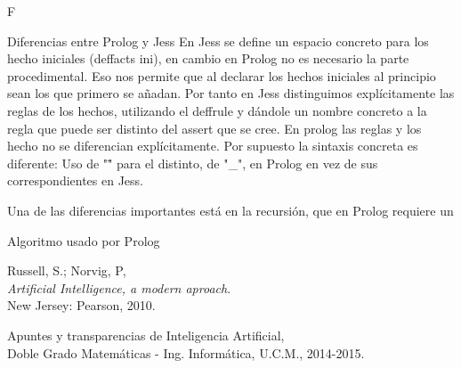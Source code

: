 F\documentclass[11pt, a4paper, spanish, openright, twoside]{book}
\begin{document}
\begin{section}{Diferencias entre Prolog y Jess}
		En Jess se define un espacio concreto para los hecho iniciales (deffacts ini), en cambio en Prolog no es necesario la parte procedimental. Eso nos permite que 
		al declarar los hechos iniciales al principio sean los que primero se añadan.
		Por tanto en Jess distinguimos explícitamente las reglas de los hechos, utilizando el deffrule y dándole un nombre concreto a la regla que puede ser distinto del assert que se cree. En prolog las reglas 
		y los hecho no se diferencian explícitamente.
		Por supuesto la sintaxis concreta es diferente: Uso de "\=" para el distinto, de "_",  en Prolog en vez de sus correspondientes en Jess.
		
		Una de las diferencias importantes está en la recursión, que en Prolog requiere un

	
\end{section}
	\newpage
	\begin{section}{Algoritmo usado por Prolog}

	\end{section}

	
\begin{thebibliography}{9}

	Russell, S.; Norvig, P, \\
	\emph{Artificial Intelligence, a modern aproach}.\\
	New Jersey: Pearson, 2010.
	
	Apuntes y transparencias de Inteligencia Artificial, \\
	Doble Grado Matemáticas - Ing. Informática, U.C.M., 2014-2015.

\end{thebibliography}
\end{document}
